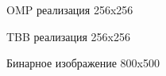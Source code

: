 \documentclass{report}
\begin{document}
\begin{figure}[H]
\caption{OMP реализация 256x256}
\end{figure}

\begin{figure}[H]
\caption{TBB реализация 256x256}
\end{figure}

\begin{figure}[H]
\caption{Бинарное изображение 800x500}
\end{figure}
\end{document}
